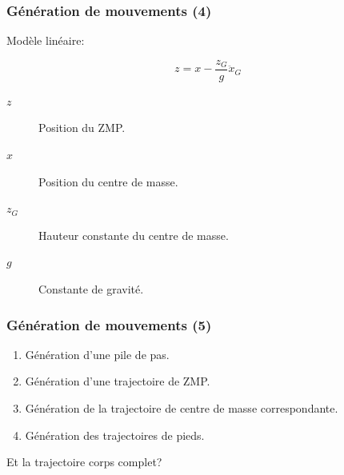 \documentclass[14pt,utf8,hyperref={pdfpagelabels=false}]{beamer}
\begin{document}
\begin{slideDecision}
  \frametitle{Génération de mouvements (4)}


  \begin{changeleftmargin}{1.1cm}
  \begin{center}

    Modèle linéaire:

    \begin{equation*}
      z = x - \frac{z_G}{g} \ddot{x}_G
    \end{equation*}

    \begin{description}
    \item[$z$] Position du ZMP.
    \item[$x$] Position du centre de masse.
    \item[$z_G$] Hauteur constante du centre de masse.
    \item[$g$] Constante de gravité.
    \end{description}
  \end{center}
  \end{changeleftmargin}
\end{slideDecision}

\begin{slideDecision}
  \frametitle{Génération de mouvements (5)}


  \begin{changeleftmargin}{1.5cm}
  \begin{center}
    \begin{enumerate}
      \item Génération d'une pile de pas.
      \item Génération d'une trajectoire de ZMP.
      \item Génération de la trajectoire de centre de masse
        correspondante.
      \item Génération des trajectoires de pieds.
    \end{enumerate}

    \bigskip

    \alert{Et la trajectoire corps complet?}
  \end{center}
  \end{changeleftmargin}
\end{slideDecision}
\end{document}

